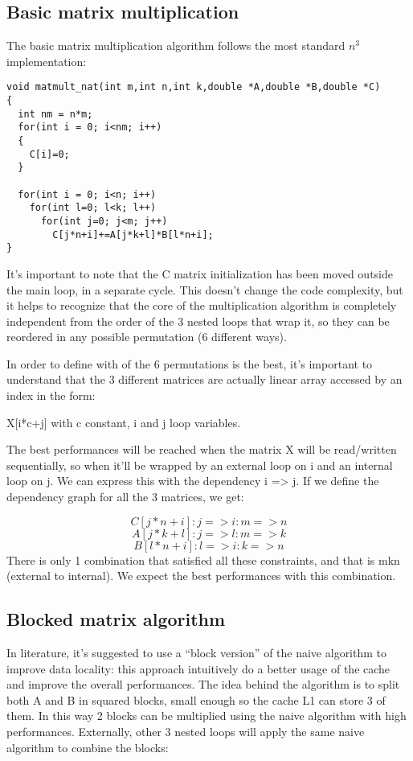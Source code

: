 \subsection{Basic matrix multiplication}
The basic matrix multiplication algorithm follows the most standard $n^3$ implementation:

\begin{lstlisting}
void matmult_nat(int m,int n,int k,double *A,double *B,double *C)
{
  int nm = n*m;
  for(int i = 0; i<nm; i++)  
  {
    C[i]=0;
  }

  for(int i = 0; i<n; i++)  
    for(int l=0; l<k; l++)
      for(int j=0; j<m; j++)
        C[j*n+i]+=A[j*k+l]*B[l*n+i];
}
\end{lstlisting}

It’s important to note that the C matrix initialization has been moved outside the main loop, in a separate cycle. This doesn’t change the code complexity, but it helps to recognize that the core of the multiplication algorithm is completely independent from the order of the 3 nested loops that wrap it, so they can be reordered in any possible permutation (6 different ways).

In order to define with of the 6 permutations is the best, it’s important to understand that the 3 different matrices are actually linear array accessed by an index in the form:

X[i*c+j] with c constant, i and j loop variables.

The best performances will be reached when the matrix X will be read/written sequentially, so when it’ll be wrapped by an external loop on i and an internal loop on j. We can express this with the dependency i => j.
If we define the dependency graph for all the 3 matrices, we get:

$$
C[j*n+i] : j => i : m => n 
$$
$$
A[j*k+l] : j => l : m => k 
$$
$$
B[l*n+i] : l => i : k => n
$$
There is only 1 combination that satisfied all these constraints, and that is mkn (external to internal). We expect the best performances with this combination.

\subsection{Blocked matrix algorithm}

In literature, it’s suggested to use a “block version” of the naive algorithm to improve data locality: this approach intuitively do a better usage of the cache and improve the overall performances.
The idea behind the algorithm is to split both A and B in squared blocks, small enough so the cache L1 can store 3 of them. In this way 2 blocks can be multiplied using the naive algorithm with high performances.
Externally, other 3 nested loops will apply the same naive algorithm to combine the blocks:

